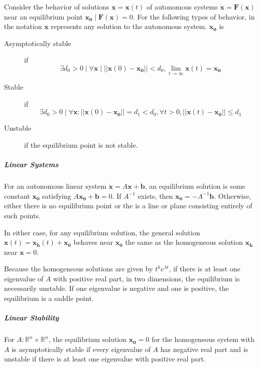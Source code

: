 \documentclass[11pt]{article}
\begin{document}
	Consider the behavior of solutions $\mathbf{x} = \mathbf{x}(t)$ of autonomous systems $\dot{\mathbf{x}} = \mathbf{F}(\mathbf{x})$ near an equilibrium point $\mathbf{x_0} \mid \mathbf{F}(\mathbf{x}) = 0$. For the following types of behavior, in the notation $\mathbf{x}$ represents any solution to the autonomous system. $\mathbf{x_0}$ is
	\begin{description}
		\item[Asymptotically stable] if 
		\begin{equation}
			\exists d_0 > 0 \mid \forall \mathbf{x} \mid ||\mathbf{x}(0) - \mathbf{x_0}|| < d_0, \lim_{t\rightarrow \infty} \mathbf{x}(t) = \mathbf{x_0}
		\end{equation} 
		\item[Stable] if
		\begin{equation}
			\exists d_0 > 0 \mid \forall \mathbf{x}: ||\mathbf{x}(0) - \mathbf{x_0}|| = d_1 < d_0, \forall t > 0, ||\mathbf{x}(t) - \mathbf{x_0}|| \leq d_1
		\end{equation}
		\item[Unstable] if the equilibrium point is not stable.
	\end{description}
	
	\subparagraph{Linear Systems} For an autonomous linear system $\dot{\mathbf{x}} = A\mathbf{x} + \mathbf{b}$, an equilibrium solution is some constant $\mathbf{x_0}$ satisfying $A\mathbf{x_0} + \mathbf{b} = 0$. If $A^{-1}$ exists, then $\mathbf{x_0} = -A^{-1}\mathbf{b}$. Otherwise, either there is no equilibrium point or the is a line or plane consisting entirely of such points. 
	
	In either case, for any equilibrium solution, the general solution $\mathbf{x}(t) = \mathbf{x_h}(t) + \mathbf{x_0}$ behaves near $\mathbf{x_0}$ the same as the homogeneous solution $\mathbf{x_h}$ near $\mathbf{x} = 0$.
	
	Because the homogeneous solutions are given by $t^ke^{\lambda t}$, if there is at least one eigenvalue of $A$ with positive real part, in two dimensions, the equilibrium is necessarily unstable. If one eigenvalue is negative and one is positive, the equilibrium is a saddle point.
	
	\subparagraph{Linear Stability} For $A: \mathbb{R}^n \times \mathbb{R}^n$, the equilibrium solution $\mathbf{x_0} = 0$ for the homogeneous system with $A$ is asymptotically stable if every eigenvalue of $A$ has negative real part and is unstable if there is at least one eigenvalue with positive real part.
\end{document}
